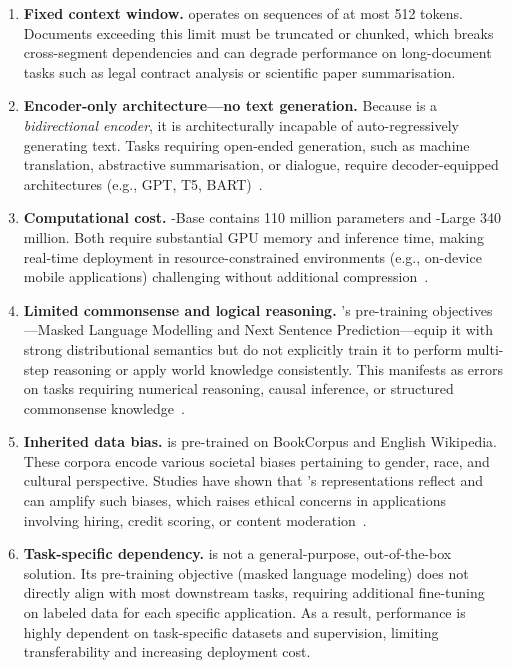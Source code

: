 \begin{enumerate}
  \item \textbf{Fixed context window.}  \bert{} operates on sequences of at most
        512 tokens.  Documents exceeding this limit must be truncated or chunked,
        which breaks cross-segment dependencies and can degrade performance on
        long-document tasks such as legal contract analysis or scientific paper
        summarisation.

  \item \textbf{Encoder-only architecture---no text generation.}  Because \bert{}
        is a \emph{bidirectional encoder}, it is architecturally incapable of
        auto-regressively generating text.  Tasks requiring open-ended generation,
        such as machine translation, abstractive summarisation, or dialogue,
        require decoder-equipped architectures (e.g., GPT, T5,
        BART)~\cite{lewis2019bart}.

  \item \textbf{Computational cost.}  \bert{}-Base contains 110 million parameters
        and \bert{}-Large 340 million.  Both require substantial GPU memory and
        inference time, making real-time deployment in resource-constrained
        environments (e.g., on-device mobile applications) challenging without
        additional compression~\cite{sanh2019distilbert}.

  \item \textbf{Limited commonsense and logical reasoning.}  \bert{}'s pre-training
        objectives---Masked Language Modelling and Next Sentence Prediction---equip
        it with strong distributional semantics but do not explicitly train it to
        perform multi-step reasoning or apply world knowledge consistently.  This
        manifests as errors on tasks requiring numerical reasoning, causal inference,
        or structured commonsense knowledge~\cite{rogers2020primer}.

  \item \textbf{Inherited data bias.}  \bert{} is pre-trained on BookCorpus and
        English Wikipedia.  These corpora encode various societal biases pertaining
        to gender, race, and cultural perspective.  Studies have shown that \bert{}'s
        representations reflect and can amplify such biases, which raises ethical
        concerns in applications involving hiring, credit scoring, or content
        moderation~\cite{bender2021dangers}.
\item \textbf{Task-specific dependency.} \bert{} is not a general-purpose, out-of-the-box 
        solution. Its pre-training objective (masked language modeling) does not directly 
        align with most downstream tasks, requiring additional fine-tuning on labeled data 
        for each specific application. As a result, performance is highly dependent on 
        task-specific datasets and supervision, limiting transferability and increasing 
        deployment cost.
\end{enumerate}


